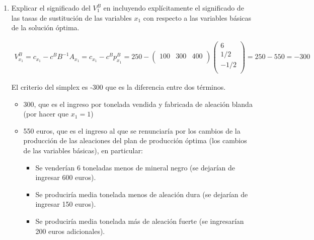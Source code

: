 \begin{enumerate}
Sería interesante producir la nueva aleación si su criterio del simplex es positivo. Es decir:

\begin{equation}
\begin{split}
V^B_{x_5} = c_{x_5}-c^BB^{-1}A_{x_5}
= c_{x_5}-\pi^BA_{x_5} = c_{x_5}
 - \begin{pmatrix}
100 & 50 & -250\\
\end{pmatrix}
\begin{pmatrix}
6 \\
4 \\
0 \\
\end{pmatrix}
 = 
c_{x_5} - 800 \geq 0
\end{split}
\end{equation}

Es decir, si el beneficio supera los 800 euros por tonelada, resultará interesante la producción de esta nueva aleación.

\item Explicar el significado del $V^B_1$ en incluyendo explícitamente el significado de las tasas de sustitución de las variables $x_1$ con respecto a las variables básicas de la solución óptima.

\begin{equation}
\begin{split}
V^B_{x_1} = c_{x_1}-c^BB^{-1}A_{x_1} =
c_{x_1}-c^Bp^B_{x_1} = 
250 
 - \begin{pmatrix}
100 & 300 & 400\\
\end{pmatrix}
\begin{pmatrix}
6   \\
1/2 \\
-1/2 \\
\end{pmatrix}
= 250 - 550 = -300
\end{split}
\end{equation}

El criterio del simplex es -300 que es la diferencia entre dos términos.
\begin{itemize}
    \item 300, que es el ingreso por tonelada vendida y fabricada de aleación blanda (por hacer que $x_1 = 1$)
    \item 550 euros, que es el ingreso al que se renunciaría por los cambios de la producción de las aleaciones del plan de producción óptima (los cambios de las variables básicas), en particular:
    \begin{itemize}
        \item Se venderían 6 toneladas menos de mineral negro (se dejarían de ingresar 600 euros).
        \item Se produciría media tonelada menos de aleación dura (se dejarían de ingresar 150 euros).
        \item Se produciría media tonelada más de aleación fuerte (se ingresarían 200 euros adicionales).
    \end{itemize}
\end{itemize}


\end{enumerate}
